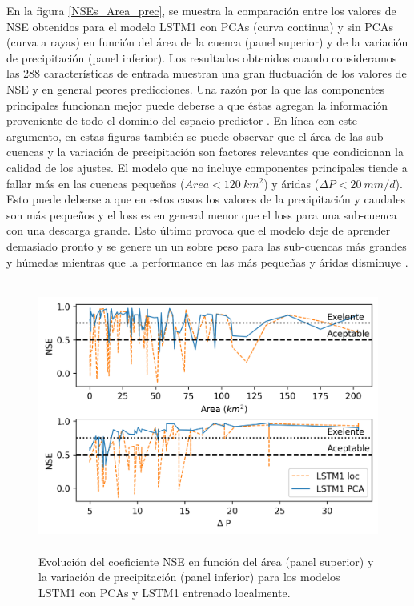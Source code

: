En la figura \ref{NSEs_Area_prec}, se muestra la comparación entre los valores de NSE obtenidos para el modelo LSTM1 con PCAs 
(curva continua) y sin PCAs (curva a rayas) en función del área de la cuenca (panel superior) y de la variación de precipitación 
(panel inferior). Los resultados obtenidos cuando consideramos las 288 características
de entrada muestran una gran fluctuación de los valores de NSE y en general peores predicciones. 
Una razón por la que las componentes principales funcionan mejor puede deberse a que éstas agregan la información proveniente de 
todo el dominio del espacio predictor \cite{Manu}. En línea con este argumento, en estas figuras también se puede observar que el 
área de las sub-cuencas y la variación de precipitación son factores relevantes que condicionan la calidad de los ajustes. 
El modelo que no incluye componentes principales  tiende a fallar más en las cuencas pequeñas ($Area  < 120~km^2$) y 
áridas  ($\Delta P < 20~mm/d$). Esto puede deberse a que en estos casos los 
valores de la precipitación y caudales son más pequeños y el loss es en general menor  que el loss para una sub-cuenca con
una descarga grande. Esto último provoca que el modelo deje de aprender demasiado pronto y se genere un
un sobre peso para las sub-cuencas más grandes y húmedas mientras que la performance en las 
más pequeñas y áridas disminuye \cite{Kratzert}.

\begin{figure}[h!]
  \begin{center}
    \includegraphics[height=3.5in]{Figures/NSE/comp_NSE_consinPCA2.png}
    \caption{ Evolución del coeficiente NSE en función del área (panel superior) y la variación de precipitación 
    (panel inferior) para los modelos LSTM1 con PCAs y LSTM1 entrenado localmente.}
    \label{NSE3}
  \end{center}
\end{figure}




